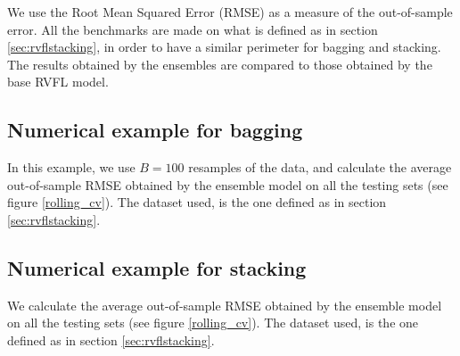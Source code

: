 We use the Root Mean Squared Error (RMSE) as a measure of the out-of-sample error. All the benchmarks are made on what is defined as  in section \ref{sec:rvflstacking}, in order to have a similar perimeter for bagging and stacking. The results obtained by the ensembles are compared to those obtained by the base RVFL model. 

\subsection{Numerical example for bagging}
\label{bagging_example}

In this example, we use $B = 100$ resamples of the data, and calculate the average out-of-sample RMSE obtained by the ensemble model on all the testing sets (see figure \ref{rolling_cv}). The dataset used, is the one defined as  in section \ref{sec:rvflstacking}.  

\subsection{Numerical example for stacking}
\label{stacking_example}

We calculate the average out-of-sample RMSE obtained by the ensemble model on all the testing sets (see figure \ref{rolling_cv}). The dataset used, is the one defined as  in section \ref{sec:rvflstacking}.
